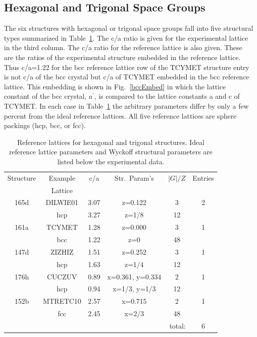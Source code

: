 \documentclass[preprint]{iucr}              %
\begin{document}
\subsection{Hexagonal and Trigonal Space Groups}

The six structures with hexagonal or trigonal space groups fall into
five structural types summarized in Table~\ref{hex}.  The c/a ratio
is given for the experimental lattice in the third column. The c/a
ratio for the reference lattice is also given.  These are the ratios
of the experimental structure embedded in the reference lattice.
Thus c/a=1.22 for the bcc reference lattice row of the TCYMET
structure entry is not c/a of the bcc crystal but c/a of TCYMET
embedded in the bcc reference lattice. This embedding is shown in
Fig.\ \ref{bccEmbed} in which the lattice constant of the bcc
crystal, $a^\prime$, is compared to the lattice constants a and c of
TCYMET. In each case in Table~\ref{hex} the arbitrary parameters
differ by only a few percent from the ideal reference lattices. All
five reference lattices are sphere packings (hcp, bcc, or fcc).

\begin{table}
\caption[Reference lattices for hexagonal and trigonal
structures.]{Reference lattices for hexagonal and trigonal
structures. Ideal reference lattice parameters and Wyckoff
structural parameters are listed below the experimental data.}
\label{hex}
\begin{center}
\begin{tabular}{cccccc}%
\cline{1-6}
Structure & Example & c/a & Str.\ Param's & $|G|/Z$ & Entries \\
          & Lattice \\
\cline{1-6}
165d    & DILWIE01  & 3.07  & z=0.122          &  3 & 2 \\
        & hcp       & 3.27  & z=1/8            & 12 \\
161a    & TCYMET    & 1.28  & z=0.000          &  3 & 1 \\
        & bcc       & 1.22  & z=0              & 48 \\
147d    & ZIZHIZ    & 1.51  & z=0.252          &  3 & 1 \\
        & hcp       & 1.63  & z=1/4            & 12 \\
176h    & CUCZUV    & 0.89  & x=0.361, y=0.334 &  2 & 1 \\
        & hcp       & 0.94  & x=1/3, y=1/3     & 12 \\
152b    & MTRETC10  & 2.57  & x=0.715          &  2 & 1 \\
        & fcc       & 2.45  & x=2/3            & 48 \\
\cline{6-6}
\multicolumn{5}{r}{total:} & 6 \\
 \cline{1-6}
\end{tabular}
\end{center}
\end{table}
\end{document}
